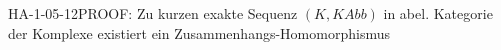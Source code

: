 
\begin{REM}{HA-1-05-12}{PROOF: Zu kurzen exakte Sequenz $(K,KAbb)$ in abel. Kategorie der Komplexe existiert ein Zusammenhangs-Homomorphismus}
\end{REM}
